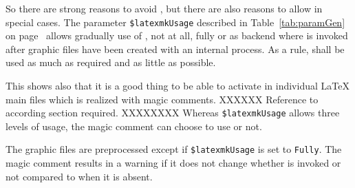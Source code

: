 So there are strong reasons to avoid , 
but there are also reasons to allow in special cases. 
The parameter \texttt{\$latexmkUsage} described in Table~\ref{tab:paramGen} 
on page~\pageref{tab:paramGen} allows gradually use of , 
not at all, fully or as backend where  is invoked 
after graphic files have been created with an internal process. 
As a rule,  shall be used as much as required and as little as possible. 

This shows also that it is a good thing 
to be able to activate  in individual \LaTeX{} main files 
which is realized with magic comments. %
XXXXXX Reference to according section required. XXXXXXXX 
Whereas \texttt{\$latexmkUsage} allows three levels of usage, 
the magic comment can choose to use  or not. 

The graphic files are preprocessed except if \texttt{\$latexmkUsage} is set to \texttt{Fully}. 
The magic comment results in a warning 
if it does not change whether  
is invoked or not compared to when it is absent. 





